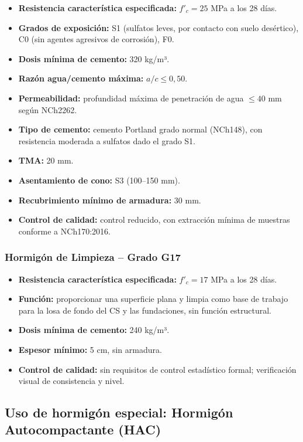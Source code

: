 \begin{itemize}
    \item \textbf{Resistencia característica especificada:} $f'_c = 25$ MPa a los 28 días.
    \item \textbf{Grados de exposición:} S1 (sulfatos leves, por contacto con suelo desértico), C0 (sin agentes agresivos de corrosión), F0.
    \item \textbf{Dosis mínima de cemento:} 320 kg/m³.
    \item \textbf{Razón agua/cemento máxima:} $a/c \leq 0{,}50$.
    \item \textbf{Permeabilidad:} profundidad máxima de penetración de agua $\leq 40$ mm según NCh2262.
    \item \textbf{Tipo de cemento:} cemento Portland grado normal (NCh148), con resistencia moderada a sulfatos dado el grado S1.
    \item \textbf{TMA:} 20 mm.
    \item \textbf{Asentamiento de cono:} S3 (100--150 mm).
    \item \textbf{Recubrimiento mínimo de armadura:} 30 mm.
    \item \textbf{Control de calidad:} control reducido, con extracción mínima de muestras conforme a NCh170:2016.
\end{itemize}

\subsubsection{Hormigón de Limpieza -- Grado G17}

\begin{itemize}
    \item \textbf{Resistencia característica especificada:} $f'_c = 17$ MPa a los 28 días.
    \item \textbf{Función:} proporcionar una superficie plana y limpia como base de trabajo para la losa de fondo del CS y las fundaciones, sin función estructural.
    \item \textbf{Dosis mínima de cemento:} 240 kg/m³.
    \item \textbf{Espesor mínimo:} 5 cm, sin armadura.
    \item \textbf{Control de calidad:} sin requisitos de control estadístico formal; verificación visual de consistencia y nivel.
\end{itemize}

\subsection{Uso de hormigón especial: Hormigón Autocompactante (HAC)}

